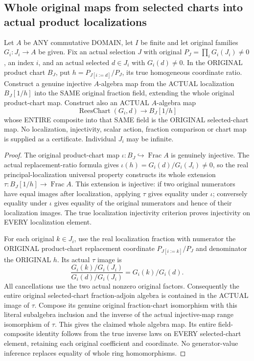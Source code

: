 \subsection{Whole original maps from selected charts into actual product localizations}

\begin{lemma}
\label{algebra:actual-localized-original-product-chart-map}
\leanok
{}
Let $A$ be ANY commutative DOMAIN, let $I$ be finite and let original families
$G_i:J_i\to A$ be given.  Fix an actual selection $J$ with original
$P_J=\prod_iG_i(J_i)\ne0$, an index $i$, and an actual selected $d\in J_i$
with $G_i(d)\ne0$.  In the ORIGINAL product chart $B_J$, put
$h=P_{J[i:=d]}/P_J$, its true homogeneous coordinate ratio.  Construct a
genuine injective $A$-algebra map from the ACTUAL localization
$B_J[1/h]$ into the SAME original fraction field, extending the whole
original product-chart map.  Construct also an ACTUAL $A$-algebra map
\[
 \operatorname{ReesChart}(G_i,d)\longrightarrow B_J[1/h]
\]
whose ENTIRE composite into that SAME field is the ORIGINAL selected-chart
map.  No localization, injectivity, scalar action, fraction comparison or
chart map is supplied as a certificate.  Individual $J_i$ may be infinite.
\end{lemma}
\begin{proof}
The original product-chart map $\iota:B_J\hookrightarrow\operatorname{Frac}A$
is genuinely injective.  The actual replacement-ratio formula gives
$\iota(h)=G_i(d)/G_i(J_i)\ne0$, so the real principal-localization universal
property constructs its whole extension $\tau:B_J[1/h]\to\operatorname{Frac}A$.
This extension is injective: if two original numerators have equal images
after localization, applying $\tau$ gives equality under $\iota$;
conversely equality under $\iota$ gives equality of the original numerators
and hence of their localization images.  The true localization injectivity
criterion proves injectivity on EVERY localization element.

For each original $k\in J_i$, use the real localization fraction with numerator
the ORIGINAL product-chart replacement coordinate $P_{J[i:=k]}/P_J$ and
denominator the ORIGINAL $h$.  Its actual $\tau$ image is
\[
 \frac{G_i(k)/G_i(J_i)}{G_i(d)/G_i(J_i)}=G_i(k)/G_i(d).
\]
All cancellations use the two actual nonzero original factors.
Consequently the entire original selected-chart fraction-adjoin algebra is
contained in the ACTUAL image of $\tau$.  Compose its genuine original
fraction-chart isomorphism with this literal subalgebra inclusion and the
inverse of the actual injective-map range isomorphism of $\tau$.  This gives
the claimed whole algebra map.  Its entire field-composite identity follows
from the true inverse laws on EVERY selected-chart element, retaining each
original coefficient and coordinate.  No generator-value inference replaces
equality of whole ring homomorphisms.
\end{proof}
